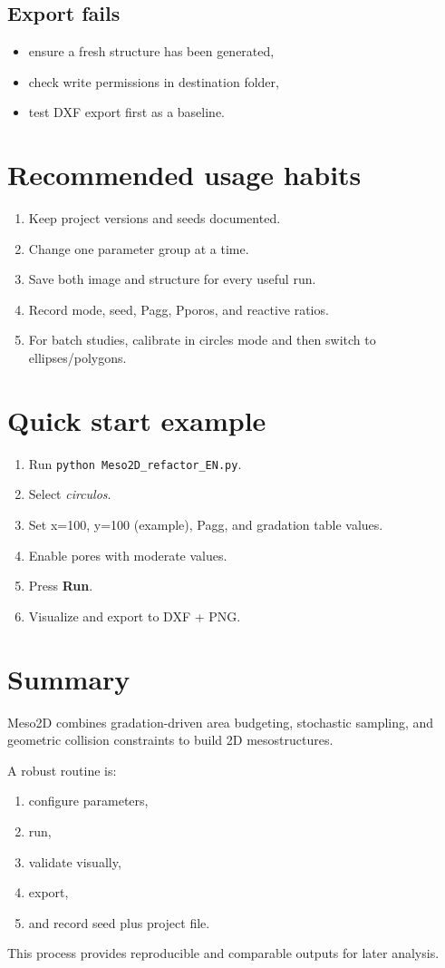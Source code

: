 \documentclass[11pt,a4paper]{article}
\begin{document}
\subsection{Export fails}
\begin{itemize}[leftmargin=1.5em]
  \item ensure a fresh structure has been generated,
  \item check write permissions in destination folder,
  \item test DXF export first as a baseline.
\end{itemize}

\section{Recommended usage habits}
\begin{enumerate}[leftmargin=1.7em]
  \item Keep project versions and seeds documented.
  \item Change one parameter group at a time.
  \item Save both image and structure for every useful run.
  \item Record mode, seed, Pagg, Pporos, and reactive ratios.
  \item For batch studies, calibrate in circles mode and then switch to ellipses/polygons.
\end{enumerate}

\section{Quick start example}
\begin{enumerate}[leftmargin=1.7em]
  \item Run \texttt{python Meso2D\_refactor\_EN.py}.
  \item Select \textit{circulos}.
  \item Set x=100, y=100 (example), Pagg, and gradation table values.
  \item Enable pores with moderate values.
  \item Press \textbf{Run}.
  \item Visualize and export to DXF + PNG.
\end{enumerate}

\section{Summary}
Meso2D combines gradation-driven area budgeting, stochastic sampling, and geometric collision constraints to build 2D mesostructures.

A robust routine is:
\begin{enumerate}[leftmargin=1.7em]
  \item configure parameters,
  \item run,
  \item validate visually,
  \item export,
  \item and record seed plus project file.
\end{enumerate}

This process provides reproducible and comparable outputs for later analysis.
\end{document}
